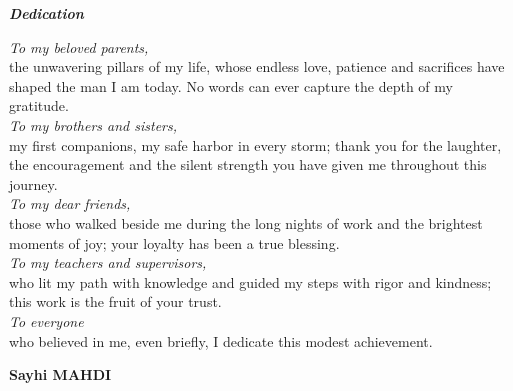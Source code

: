 
\thispagestyle{empty}
\vspace*{1cm}

\begin{center}
{\Huge\bfseries\color{primary}\itshape Dedication}\\[0.4cm]
\end{center}

\vspace{1cm}

\begin{center}
\itshape\large
\begin{minipage}{0.80\textwidth}

\textit{To my beloved parents,}\\
the unwavering pillars of my life, whose endless love, patience and sacrifices have shaped the man I am today. No words can ever capture the depth of my gratitude.\\[0.5cm]

\textit{To my brothers and sisters,}\\
my first companions, my safe harbor in every storm; thank you for the laughter, the encouragement and the silent strength you have given me throughout this journey.\\[0.5cm]

\textit{To my dear friends,}\\
those who walked beside me during the long nights of work and the brightest moments of joy; your loyalty has been a true blessing.\\[0.5cm]

\textit{To my teachers and supervisors,}\\
who lit my path with knowledge and guided my steps with rigor and kindness; this work is the fruit of your trust.\\[0.5cm]

\textit{To everyone}\\
who believed in me, even briefly, I dedicate this modest achievement.

\vspace{1cm}
\hfill\textbf{Sayhi MAHDI}
\end{minipage}
\end{center}

\cleardoublepage
